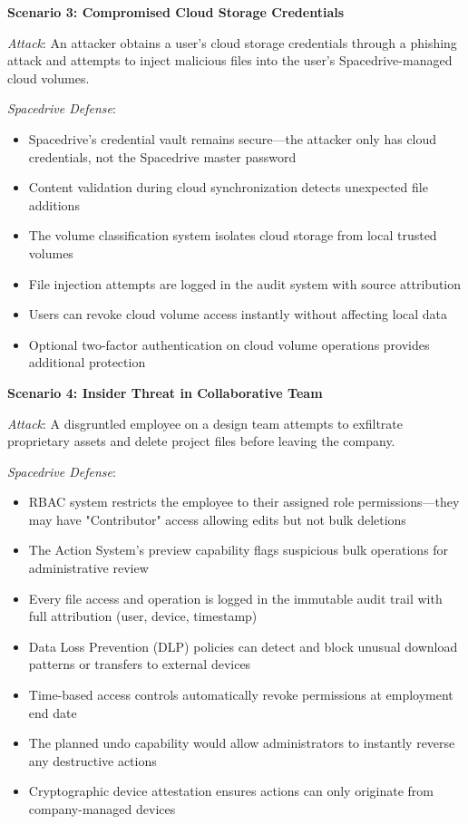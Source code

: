 \documentclass[sigconf]{acmart}
\begin{document}
\textbf{Scenario 3: Compromised Cloud Storage Credentials}

\emph{Attack}: An attacker obtains a user's cloud storage credentials through a phishing attack and attempts to inject malicious files into the user's Spacedrive-managed cloud volumes.

\emph{Spacedrive Defense}:
\begin{itemize}[noitemsep, topsep=0pt]
\item Spacedrive's credential vault remains secure---the attacker only has cloud credentials, not the Spacedrive master password
\item Content validation during cloud synchronization detects unexpected file additions
\item The volume classification system isolates cloud storage from local trusted volumes
\item File injection attempts are logged in the audit system with source attribution
\item Users can revoke cloud volume access instantly without affecting local data
\item Optional two-factor authentication on cloud volume operations provides additional protection
\end{itemize}

\textbf{Scenario 4: Insider Threat in Collaborative Team}

\emph{Attack}: A disgruntled employee on a design team attempts to exfiltrate proprietary assets and delete project files before leaving the company.

\emph{Spacedrive Defense}:
\begin{itemize}[noitemsep, topsep=0pt]
\item RBAC system restricts the employee to their assigned role permissions---they may have "Contributor" access allowing edits but not bulk deletions
\item The Action System's preview capability flags suspicious bulk operations for administrative review
\item Every file access and operation is logged in the immutable audit trail with full attribution (user, device, timestamp)
\item Data Loss Prevention (DLP) policies can detect and block unusual download patterns or transfers to external devices
\item Time-based access controls automatically revoke permissions at employment end date
\item The planned undo capability would allow administrators to instantly reverse any destructive actions
\item Cryptographic device attestation ensures actions can only originate from company-managed devices
\end{itemize}
\end{document}

